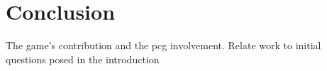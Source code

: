 \section{Conclusion}
The game's contribution and the pcg involvement. 
Relate work to initial questions posed in the introduction